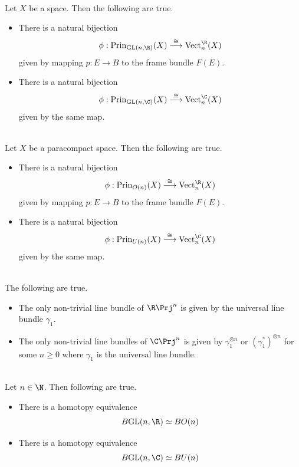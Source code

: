 \documentclass[a4paper]{article}
\begin{document}
\begin{prp}{}{}\\
Let $X$ be a space. Then the following are true. 
\begin{itemize}
\item There is a natural bijection $$\phi:\text{Prin}_{\text{GL}(n,\R)}(X)\overset{\cong}{\longrightarrow}\text{Vect}_n^\R(X)$$ given by mapping $p:E\to B$ to the frame bundle $F(E)$.
\item There is a natural bijection $$\phi:\text{Prin}_{\text{GL}(n,\C)}(X)\overset{\cong}{\longrightarrow}\text{Vect}_n^\C(X)$$ given by the same map. 
\end{itemize}
\end{prp}

\begin{prp}{}{}\\
Let $X$ be a paracompact space. Then the following are true. 
\begin{itemize}
\item There is a natural bijection $$\phi:\text{Prin}_{O(n)}(X)\overset{\cong}{\longrightarrow}\text{Vect}_n^\R(X)$$ given by mapping $p:E\to B$ to the frame bundle $F(E)$. 
\item There is a natural bijection $$\phi:\text{Prin}_{U(n)}(X)\overset{\cong}{\longrightarrow}\text{Vect}_n^\C(X)$$ given by the same map. 
\end{itemize}
\end{prp}

\begin{eg}{}{}\\
The following are true. 
\begin{itemize}
\item The only non-trivial line bundle of $\R\Prj^n$ is given by the universal line bundle $\gamma_1$. 
\item The only non-trivial line bundles of $\C\Prj^n$ is given by $\gamma_1^{\otimes n}$ or $(\gamma_1^\ast)^{\otimes n}$ for some $n\geq 0$ where $\gamma_1$ is the universal line bundle. 
\end{itemize}
\end{eg}

\begin{prp}{}{}\\
Let $n\in\N$. Then following are true. 
\begin{itemize}
\item There is a homotopy equivalence $$B\text{GL}(n,\R)\simeq BO(n)$$
\item There is a homotopy equivalence $$B\text{GL}(n,\C)\simeq BU(n)$$
\end{itemize}
\end{prp}
\end{document}
